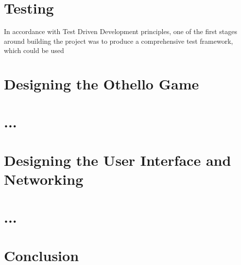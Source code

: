 \documentclass[a4wide, 11pt]{article}
\begin{document}
\pagebreak

\section{Testing}
In accordance with Test Driven Development principles, one of the first stages around building the project was to produce a comprehensive test framework, which could be used

\section{Designing the Othello Game}



\pagebreak
\section{...}
\pagebreak
\section{Designing the User Interface and Networking}
\pagebreak
\section{...}
\pagebreak
\section{Conclusion}
\end{document}
